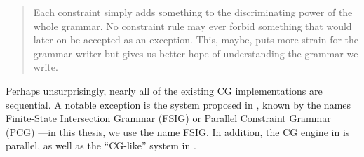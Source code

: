 { \begin{quote}
 Each constraint simply adds something to the discriminating power of the
 whole grammar. No constraint rule may ever forbid something that would
 later on be accepted as an exception. This, maybe, puts more strain for
 the grammar writer but gives us better hope of understanding the grammar
 we write.
 \end{quote}

Perhaps unsurprisingly, nearly all of the existing CG implementations are sequential.
A notable exception is the system proposed in \cite{koskenniemi90}, known by the names Finite-State Intersection Grammar (FSIG) or Parallel Constraint Grammar (PCG) \cite{koskenniemi97}---in this thesis, we use the name FSIG. 
In addition, the CG engine in \cite{listenmaa_claessen2015} is parallel,
as well as the ``CG-like'' system in \cite{lager98}.




% 
% 
% 
% 
% 

  
}

